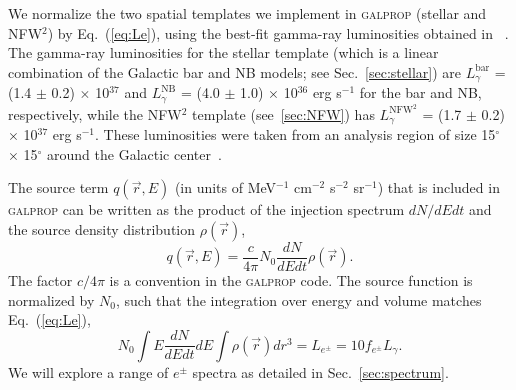 \documentclass[doublespace,nopageskip]{VTthesis} %
\begin{document}
We normalize the two spatial templates we implement in \textsc{galprop} (stellar and NFW$^2$) by Eq.~(\ref{eq:Le}), using the best-fit gamma-ray luminosities obtained in ~\citet{2018NatAs...2..387M}. The gamma-ray luminosities for the stellar template (which is a linear combination of the Galactic bar and NB models; see Sec.~\ref{sec:stellar}) are $L^{\text{bar}}_\gamma$ = (1.4 $\pm$ 0.2) $\times$ 10$^{37}$ and $L^{\text{NB}}_\gamma$ = (4.0 $\pm$ 1.0) $\times$ 10$^{36}$ erg s$^{-1}$ for the bar and NB, respectively, while the NFW$^2$ template (see~\ref{sec:NFW}) has $L^{\text{NFW}^2}_\gamma$ = (1.7 $\pm$ 0.2) $\times$ 10$^{37}$ erg s$^{-1}$. These luminosities were taken from an analysis region of size 15$^\circ$ $\times$ 15$^\circ$ around the Galactic center~\cite{2018NatAs...2..387M}.

The source term $q(\vec{r},E)$ (in units of  MeV$^{-1}$ cm$^{-2}$ s$^{-2}$ sr$^{-1}$) that is included in \textsc{galprop} can be written as the product of the injection spectrum $dN/dEdt$ and the source density distribution $\rho(\vec{r})$,
\begin{equation}
  q(\vec{r},E) = \frac{c}{4\pi} N_0 \dfrac{dN}{dEdt}\rho(\vec{r}).
\end{equation}
The factor $c/4\pi$ is a convention in the \textsc{galprop} code. The source function is normalized by $N_0$, such that the integration over energy and volume matches Eq.~(\ref{eq:Le}),
\begin{equation}
  \label{eq:normal}
  N_0 \int E\dfrac{dN}{dEdt}dE \int\rho(\vec{r})dr^3 = L_{e^\pm} = 10 f_{e^\pm} L_\gamma.
\end{equation}
We will explore a range of $e^\pm$ spectra as detailed in Sec.~\ref{sec:spectrum}.
\end{document}
